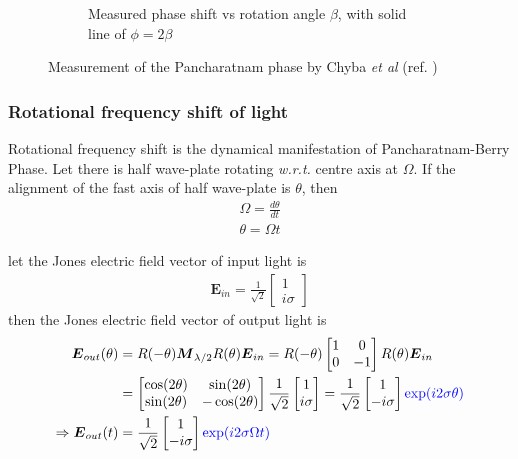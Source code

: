 \documentclass[11pt,a4paper]{article}
\numberwithin{equation}{section}
\begin{document}
\begin{figure}[H]
\begin{subfigure}[H]{0.41\textwidth}
		\caption{Measured phase shift vs rotation angle $\beta$, with solid line of $\phi=2\beta$}
		\label{fig:chyba b}
	\end{subfigure}
	\caption{Measurement of the Pancharatnam phase by Chyba \textit{et al} (ref. \cite{chyba 88})}
	\label{fig:chyba}
\end{figure}


\subsubsection{Rotational frequency shift of light}
Rotational frequency shift is the dynamical manifestation of Pancharatnam-Berry Phase. Let there is half wave-plate rotating \textit{w.r.t.} centre axis at $\Omega$. If the alignment of the fast axis of half wave-plate is $\theta$, then
\begin{align}
	\Omega = \frac{d\theta}{dt}\\
	\theta = \Omega t
\end{align}

let the Jones electric field vector of input light is
 \begin{align}
 	\boldsymbol{E}_{in} = \frac{1}{\sqrt{2}}
 	\begin{bmatrix}
 		1\\i\sigma
 	\end{bmatrix}
 \end{align}
then the Jones electric field vector of output light is
\begin{align}
	\boldsymbol{E}_{out}(\theta)&=R(-\theta)\boldsymbol{M}_{\lambda/2}R(\theta)\boldsymbol{E}_{in}
	=R(-\theta)
	\begin{bmatrix}
		1 & 0\\
		0 & -1
	\end{bmatrix}
	R(\theta)\boldsymbol{E}_{in}\nonumber\\
	&=\begin{bmatrix}
		\cos(2\theta) & \sin(2\theta)\\
		\sin(2\theta) & -\cos(2\theta)
	\end{bmatrix}
	\frac{1}{\sqrt{2}}
	\begin{bmatrix}
		1\\i\sigma
	\end{bmatrix}
	= \frac{1}{\sqrt{2}}
	\begin{bmatrix}
		1\\-i\sigma
	\end{bmatrix}
	{\color{blue}\exp(i2\sigma\theta)}\nonumber\\
	\Rightarrow\boldsymbol{E}_{out}(t)&= \frac{1}{\sqrt{2}}
	\begin{bmatrix}
		1\\-i\sigma
	\end{bmatrix}
	{\color{blue}\exp(i2\sigma\Omega t)}
\end{align}
\end{document}
